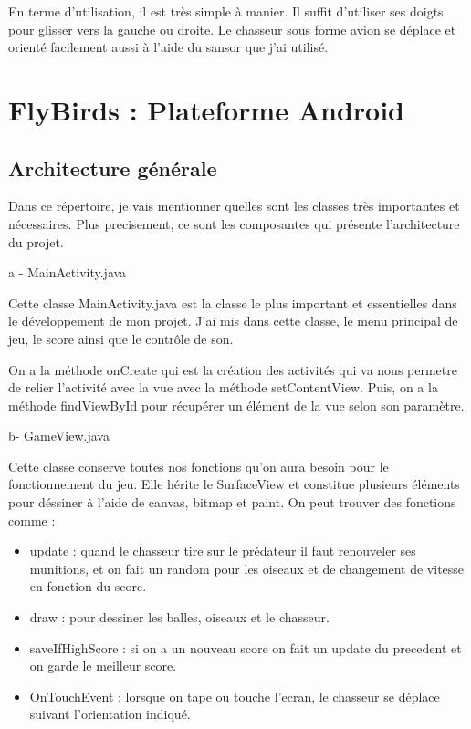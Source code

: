 \documentclass{rapportECL}
\begin{document}
En terme d'utilisation, il est très simple à manier. Il suffit d'utiliser ses doigts pour glisser vers la gauche ou droite. Le chasseur sous forme avion se déplace et orienté facilement aussi à l'aide du sansor que j'ai utilisé. 



\section{FlyBirds : Plateforme Android}
\subsection{Architecture générale}
Dans ce répertoire, je vais mentionner quelles sont les classes très importantes et nécessaires. Plus precisement, ce sont les composantes qui présente l'architecture du projet.\newline


a - MainActivity.java

Cette classe MainActivity.java est la classe le plus important et essentielles dans le développement de mon projet. J'ai mis dans cette classe, le menu principal de jeu, le score ainsi que le contrôle de son.

On a la méthode onCreate\cite{AndroidStudio} qui est la création des activités qui va nous permetre de relier l'activité avec la vue avec la méthode setContentView. Puis, on a la méthode findViewById pour récupérer un élément de la vue selon son paramètre. \newline 

b- GameView.java

Cette classe conserve toutes nos fonctions qu'on aura besoin pour le fonctionnement du jeu. Elle hérite le SurfaceView et constitue plusieurs éléments pour déssiner à l'aide de canvas, bitmap et paint. On peut trouver des fonctions comme :
\begin{itemize}
    \item update : quand le chasseur tire sur le prédateur il faut renouveler ses munitions, et on fait un random pour les oiseaux et de changement de vitesse en fonction du score.
    \item draw : pour dessiner les balles, oiseaux et le chasseur.
    \item saveIfHighScore : si on a un nouveau score on fait un update du precedent et on garde le meilleur score.
    \item OnTouchEvent : lorsque on tape ou touche l'ecran, le chasseur se déplace suivant l'orientation indiqué. \newline
\end{itemize}
\end{document}
